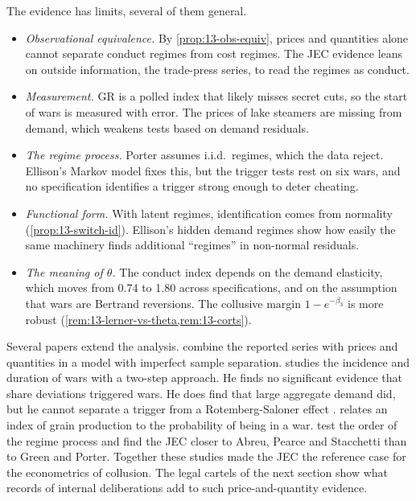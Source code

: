 The evidence has limits, several of them general.
\begin{itemize}
\item \emph{Observational equivalence.} By \cref{prop:13-obs-equiv}, prices and quantities alone cannot separate
conduct regimes from cost regimes. The JEC evidence leans on outside information, the trade-press series, to read
the regimes as conduct.
\item \emph{Measurement.} GR is a polled index that likely misses secret cuts, so the start of wars is measured with
error. The prices of lake steamers are missing from demand, which weakens tests based on demand residuals.
\item \emph{The regime process.} Porter assumes i.i.d.\ regimes, which the data reject. Ellison's Markov model fixes
this, but the trigger tests rest on six wars, and no specification identifies a trigger strong enough to deter
cheating.
\item \emph{Functional form.} With latent regimes, identification comes from normality (\cref{prop:13-switch-id}).
Ellison's hidden demand regimes show how easily the same machinery finds additional ``regimes'' in non-normal
residuals.
\item \emph{The meaning of $\theta$.} The conduct index depends on the demand elasticity, which moves from 0.74 to
1.80 across specifications, and on the assumption that wars are Bertrand reversions. The collusive margin
$1 - e^{-\beta_3}$ is more robust (\cref{rem:13-lerner-vs-theta,rem:13-corts}).
\end{itemize}

Several papers extend the analysis.  combine the reported series with prices and quantities in a
model with imperfect sample separation.  studies the incidence and duration of wars with a two-step
approach. He finds no significant evidence that share deviations triggered wars. He does find that large aggregate
demand did, but he cannot separate a trigger from a Rotemberg-Saloner effect \citep[p.~39]{Ellison1994}.
 relates an index of grain production to the probability of being in a war.
 test the order of the regime process and find the JEC closer to Abreu, Pearce and Stacchetti
than to Green and Porter. Together these studies made the JEC the reference case for the econometrics of collusion.
The legal cartels of the next section show what records of internal deliberations add to such price-and-quantity
evidence.

